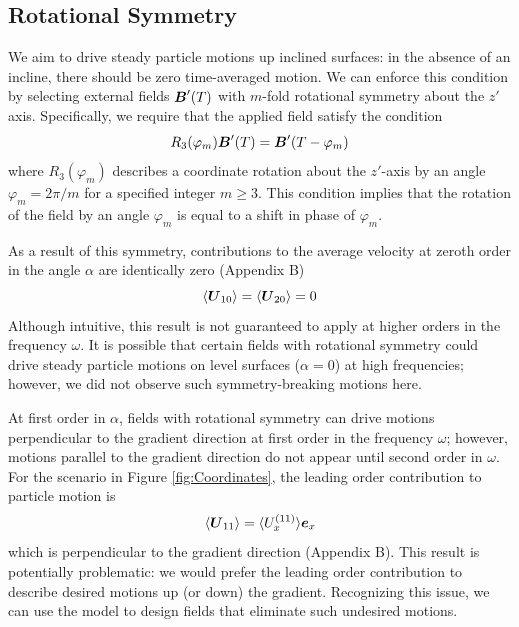 \subsection{Rotational Symmetry}

We aim to drive steady particle motions up inclined surfaces: in the absence of an incline, there should be zero time-averaged motion.  We can enforce this condition by selecting external fields $\boldsymbol{B}'(T)$ with $m$-fold rotational symmetry about the $z'$ axis.  Specifically, we require that the applied field satisfy the condition
\begin{equation}
    R_3(\varphi_m) \boldsymbol{B}'(T) = \boldsymbol{B}'(T-\varphi_m) \label{eq:rotation}
\end{equation}
where $R_3(\varphi_m)$ describes a coordinate rotation about the $z'$-axis by an angle $\varphi_m=2\pi/m$ for a specified integer $m\geq3$. This condition implies that the rotation of the field by an angle $\varphi_m$ is equal to a shift in phase of $\varphi_m$.  

As a result of this symmetry, contributions to the average velocity at zeroth order in the angle $\alpha$ are identically zero (Appendix B)
\begin{equation}
    \langle\boldsymbol{U}_{10}\rangle = \langle\boldsymbol{U}_{20}\rangle = 0 \label{eq:alpha0}
\end{equation}
Although intuitive, this result is not guaranteed to apply at higher orders in the frequency $\omega$. It is possible that certain fields with rotational symmetry could drive steady particle motions on level surfaces ($\alpha=0$) at high frequencies; however, we did not observe such symmetry-breaking motions here.

At first order in $\alpha$, fields with rotational symmetry can drive motions perpendicular to the gradient direction at first order in the frequency $\omega$; however, motions parallel to the gradient direction do not appear until second order in $\omega$. For the scenario in Figure \ref{fig:Coordinates}, the leading order contribution to particle motion is
\begin{equation}
    \langle \boldsymbol{U}_{11}\rangle = \langle U_x^{(11)}\rangle \boldsymbol{e}_{x}  \label{eq:alpha1}
\end{equation}
which is perpendicular to the gradient direction (Appendix B). This result is potentially problematic: we would prefer the leading order contribution to describe desired motions up (or down) the gradient.  Recognizing this issue, we can use the model to design fields that eliminate such undesired motions.

